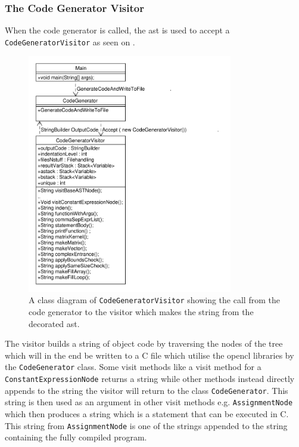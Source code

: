 \subsubsection*{The Code Generator Visitor}
When the code generator is called, the \acrshort{ast} is used to accept a \texttt{CodeGeneratorVisitor} as seen on .

\begin{figure}[!ht]
\centering
 \includegraphics[width=0.8\textwidth]{figures/ClassDiagrams/CodeGeneratorCall.pdf}%
\caption{A class diagram of \texttt{CodeGeneratorVisitor} showing the call from the code generator to the visitor which makes the string from the decorated \acrshort{ast}.}\label{fig:CodeGeneratorVisitor}
\vspace{-15pt}
\end{figure}

The visitor builds a string of object code by traversing the nodes of the tree which will in the end be written to a  C file which utilise the \gls{opencl} libraries by the \texttt{CodeGenerator} class.
Some visit methods like a visit method for a \texttt{ConstantExpressionNode} returns a string while other methods instead directly appends to the string the visitor will return to the class \texttt{CodeGenerator}.
This string is then used as an argument in other visit methods e.g. \texttt{AssignmentNode} which then produces a string which is a statement that can be executed in C.
This string from \texttt{AssignmentNode} is one of the strings appended to the string containing the fully compiled program.


